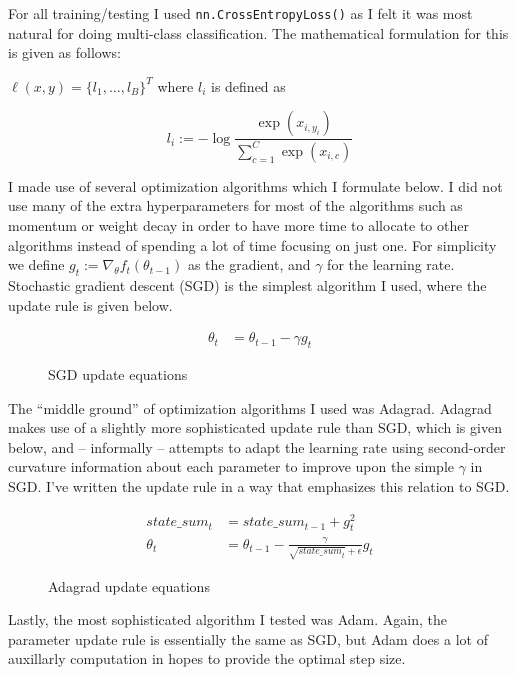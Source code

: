 \documentclass[12pt, twoside]{report}
\begin{document}
For all training/testing I used \lstinline[style=inlinepython]{nn.CrossEntropyLoss()}
as I felt it was most natural for doing multi-class classification.
The mathematical formulation for this is given as follows:

$\ell(x,y) = \{l_1, \ldots, l_B\}^T$ where $l_i$ is defined as 

\[
    l_i := -\log \frac{\exp(x_{i,y_i})}{\sum_{c=1}^{C} \exp(x_{i,c})}
\]

I made use of several optimization algorithms which I formulate below.
I did not use many of the extra hyperparameters for most of the algorithms such as 
momentum or weight decay in order to have more time to allocate to other algorithms instead
of spending a lot of time focusing on just one.
For simplicity we define $g_t := \nabla_{\theta} f_t(\theta_{t-1})$ as the gradient, and
$\gamma$ for the learning rate.
Stochastic gradient descent (SGD) is the simplest algorithm I used, where the update rule
is given below.

\begin{figure}[H]
    \centering
    \begin{align}
        \theta_t &= \theta_{t-1} - \gamma g_t
    \end{align}
    \caption*{SGD update equations}
\end{figure}

The ``middle ground'' of optimization algorithms I used was Adagrad. Adagrad makes use of a slightly
more sophisticated update rule than SGD, which is given below, and – informally – attempts to adapt
the learning rate using second-order curvature information about each parameter to improve upon the 
simple $\gamma$ in SGD. I've written the update rule in a way that emphasizes this relation to SGD.

\begin{figure}[H]
    \centering
    \begin{align}
        \textit{state\_sum}_t &= \textit{state\_sum}_{t-1} + g_t^2 \\
        \theta_t &= \theta_{t-1} - \frac{\gamma}{\sqrt{\textit{state\_sum}_t} + \epsilon} g_t
    \end{align}
    \caption*{Adagrad update equations}
\end{figure}

Lastly, the most sophisticated algorithm I tested was Adam. Again, the parameter update rule is
essentially the same as SGD, but Adam does a lot of auxillarly computation in hopes to provide
the optimal step size.
\end{document}
